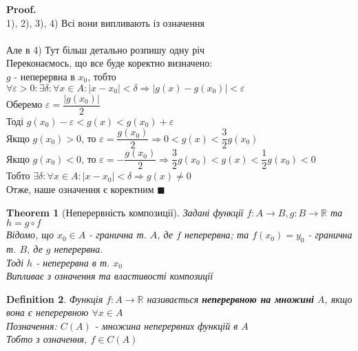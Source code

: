 \documentclass[a4paper, 14pt]{extarticle}
\theoremstyle{theoremdd}
\newtheorem{theorem}{Theorem}[subsection]
\theoremstyle{theoremdd}
\newtheorem{definition}[theorem]{Definition}
\theoremstyle{theoremdd}
\theoremstyle{theoremdd}
\theoremstyle{theoremdd}
\theoremstyle{theoremdd}
\theoremstyle{theoremdd}
\theoremstyle{theoremdd}
\newenvironment{pf}{\vspace*{-3mm} \textbf{Proof. \\}}{$\blacksquare$}
\begin{document}
\begin{pf}
1), 2), 3), 4) Всі вони випливають із означення\\ \\
Але в 4) Тут більш детально розпишу одну річ\\
Переконаємось, що все буде коректно визначено:\\
$g$ - неперервна в $x_0$, тобто $\forall \varepsilon > 0: \exists \delta: \forall x \in A: |x-x_0|<\delta \Rightarrow |g(x)-g(x_0)|<\varepsilon$\\
Оберемо $\varepsilon = \dfrac{|g(x_0)|}{2}$\\
Тоді $g(x_0)-\varepsilon <g(x) <g(x_0)+\varepsilon$\\
Якщо $g(x_0) > 0$, то $\varepsilon = \dfrac{g(x_0)}{2} \Rightarrow 0 < g(x) < \dfrac{3}{2}g(x_0)$\\
Якщо $g(x_0) < 0$, то $\varepsilon = -\dfrac{g(x_0)}{2} \Rightarrow \dfrac{3}{2}g(x_0) < g(x) < \dfrac{1}{2}g(x_0) < 0$\\
Тобто $\exists \delta: \forall x \in A: |x-x_0|<\delta \Rightarrow g(x) \neq 0$\\
Отже, наше означення є коректним
\end{pf}

\begin{theorem}[Неперервність композиції]
Задані функції $f: A \to B, g: B \to \mathbb{R}$ та $h = g \circ f$\\
Відомо, що $x_0 \in A$ - гранична т. $A$, де $f$ неперервна; та $f(x_0) = y_0$ - гранична т. $B$, де $g$ неперервна.\\
Тоді $h$ - неперервна в т. $x_0$\\
\textit{Випливає з означення та властивості композиції}
\end{theorem}

\begin{definition}
Функція $f: A \to \mathbb{R}$ називається \textbf{неперервною на множині} $A$, якщо вона є неперервною $\forall x \in A$\\
Позначення: $C(A)$ - множина неперервних функцій в $A$\\
Тобто з означення, $f \in C(A)$
\end{definition}
\end{document}
